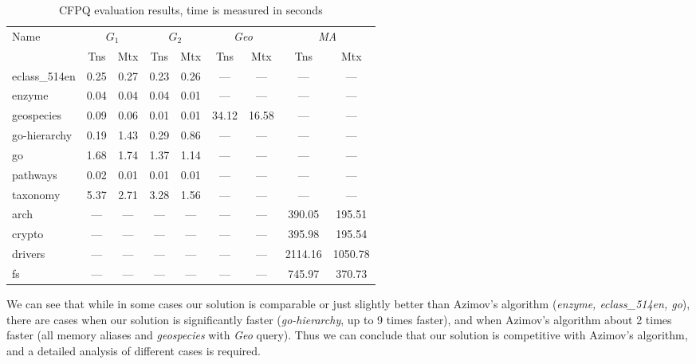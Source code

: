 {\setlength{\tabcolsep}{0.2em}
  \begin{table}
    \centering   
    \caption{CFPQ evaluation results, time is measured in seconds}
    \label{tbl:CFPQ_index}
    \small
    \begin{tabular}{| l | c | c | c | c | c | c | c | c |}
      \hline

      \multirow{2}{*}{Name}  & \multicolumn{2}{c|}{$G_1$} & \multicolumn{2}{c|}{$G_2$} & \multicolumn{2}{c|}{\textit{Geo}} & \multicolumn{2}{c|}{\textit{MA}}\\
      \cline{2-9}
                      & Tns    & Mtx    & Tns  & Mtx  & Tns   & Mtx   & Tns     & Mtx \\
      \hline
      \hline
      eclass\_514en   & 0.25   & 0.27   & 0.23 & 0.26 & ---   & ---   & ---     & ---\\
      enzyme          & 0.04   & 0.04   & 0.04 & 0.01 & ---   & ---   & ---     & ---\\
      geospecies      & 0.09   & 0.06   & 0.01 & 0.01 & 34.12 & 16.58 & ---     & ---\\
      go-hierarchy    & 0.19   & 1.43   & 0.29 & 0.86 & ---   & ---   & ---     & ---\\
      go              & 1.68   & 1.74   & 1.37 & 1.14 & ---   & ---   & ---     & ---\\
      pathways        & 0.02   & 0.01   & 0.01 & 0.01 & ---   & ---   & ---     & ---\\
      taxonomy        & 5.37   & 2.71   & 3.28 & 1.56 & ---   & ---   & ---     & ---\\
      \hline
      arch            & ---    & ---    & ---  & ---  & ---   & ---   & 390.05  & 195.51  \\
      crypto          & ---    & ---    & ---  & ---  & ---   & ---   & 395.98  & 195.54  \\
      drivers         & ---    & ---    & ---  & ---  & ---   & ---   & 2114.16 & 1050.78 \\
      fs              & ---    & ---    & ---  & ---  & ---   & ---   & 745.97  & 370.73  \\
      \hline
    \end{tabular}
  \end{table}
}

We can see that while in some cases our solution is comparable or just slightly better than Azimov's algorithm (\textit{enzyme, eclass\_514en, go}), there are cases when our solution is significantly faster (\textit{go-hierarchy}, up to 9 times faster), and when Azimov's algorithm about 2 times faster (all memory aliases and \textit{geospecies} with \textit{Geo} query).
Thus we can conclude that our solution is competitive with Azimov's algorithm, and a detailed analysis of different cases is required.

